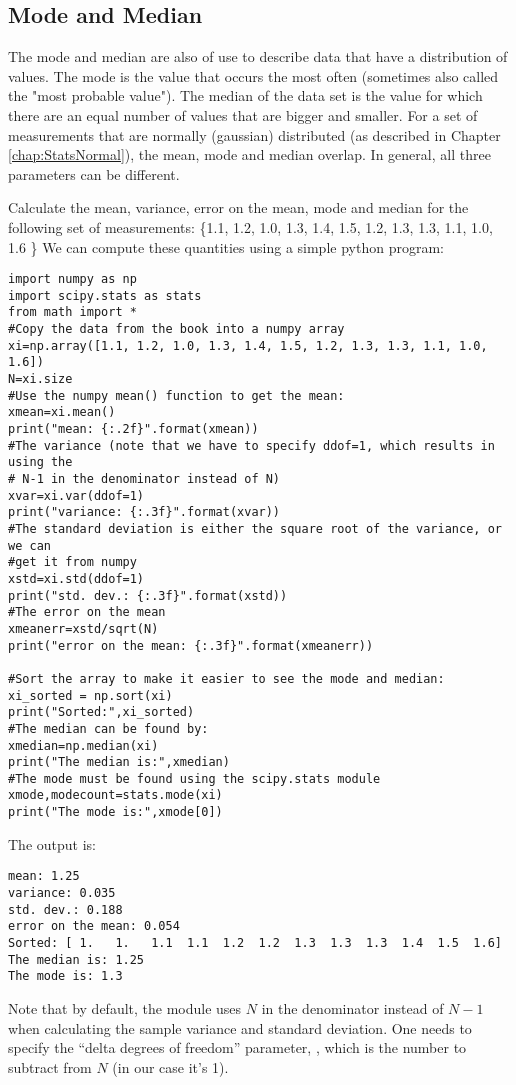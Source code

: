 \subsection{Mode and Median}

The mode and median are also of use to describe data that have a distribution of values. The mode is the value that occurs the most often (sometimes also called the "most probable value"). The median of the data set is the value for which there are an equal number of values that are bigger and smaller. For a set of measurements that are normally (gaussian) distributed (as described in Chapter \ref{chap:StatsNormal}), the mean, mode and median overlap. In general, all three parameters can be different. 

\begin{example}{}{Calculate the mean, variance, error on the mean, mode and median for the following set of measurements: \{1.1, 1.2, 1.0, 1.3, 1.4, 1.5, 1.2, 1.3, 1.3, 1.1, 1.0, 1.6 \}}{}
\label{ex:meanvardata}
We can compute these quantities using a simple python program:
\begin{lstlisting}[frame=single] 
import numpy as np
import scipy.stats as stats
from math import *
#Copy the data from the book into a numpy array
xi=np.array([1.1, 1.2, 1.0, 1.3, 1.4, 1.5, 1.2, 1.3, 1.3, 1.1, 1.0, 1.6])
N=xi.size
#Use the numpy mean() function to get the mean:
xmean=xi.mean()
print("mean: {:.2f}".format(xmean))
#The variance (note that we have to specify ddof=1, which results in using the 
# N-1 in the denominator instead of N)
xvar=xi.var(ddof=1)
print("variance: {:.3f}".format(xvar))
#The standard deviation is either the square root of the variance, or we can
#get it from numpy
xstd=xi.std(ddof=1)
print("std. dev.: {:.3f}".format(xstd))
#The error on the mean
xmeanerr=xstd/sqrt(N)
print("error on the mean: {:.3f}".format(xmeanerr))

#Sort the array to make it easier to see the mode and median:
xi_sorted = np.sort(xi)
print("Sorted:",xi_sorted)
#The median can be found by:
xmedian=np.median(xi)
print("The median is:",xmedian)
#The mode must be found using the scipy.stats module
xmode,modecount=stats.mode(xi)
print("The mode is:",xmode[0])
\end{lstlisting}
The output is:
\begin{verbatim}
mean: 1.25
variance: 0.035
std. dev.: 0.188
error on the mean: 0.054
Sorted: [ 1.   1.   1.1  1.1  1.2  1.2  1.3  1.3  1.3  1.4  1.5  1.6]
The median is: 1.25
The mode is: 1.3
\end{verbatim}

Note that by default, the  module uses $N$ in the denominator instead of $N-1$ when calculating the sample variance and standard deviation. One needs to specify the ``delta degrees of freedom'' parameter, , which is the number to subtract from $N$ (in our case it's 1).

\end{example}

